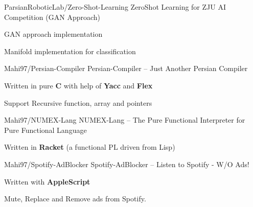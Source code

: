 \begin{cventries}
  \cventry
    {ParsianRoboticLab/Zero-Shot-Learning} %
    {ZeroShot Learning for ZJU AI Competition (GAN Approach)} %
    {} %
    {} %
    {
      \begin{cvitems} %
        \item {GAN approach implementation}
        \item {Manifold implementation for classification}
      \end{cvitems}
    }


  \cventry
    {Mahi97/Persian-Compiler} %
    {Persian-Compiler -- Just Another Persian Compiler} %
    {} %
    {} %
    {
      \begin{cvitems} %
        \item {Written in pure \textbf{C} with help of \textbf{Yacc} and \textbf{Flex}}
        \item {Support Recursive function, array and pointers}
      \end{cvitems}
    }

  \cventry
    {Mahi97/NUMEX-Lang} %
    {NUMEX-Lang -- The Pure Functional Interpreter for Pure Functional Language} %
    {} %
    {} %
    {
      \begin{cvitems} %
        \item {Written in \textbf{Racket} (a functional PL driven from Lisp)}
      \end{cvitems}
    }

  \cventry
    {Mahi97/Spotify-AdBlocker} %
    {Spotify-AdBlocker -- Listen to Spotify - W/O Ads!} %
    {} %
    {} %
    {
      \begin{cvitems} %
        \item {Written with \textbf{AppleScript}}
        \item {Mute, Replace and Remove ads from Spotify.}
      \end{cvitems}
    }

    

\end{cventries}
